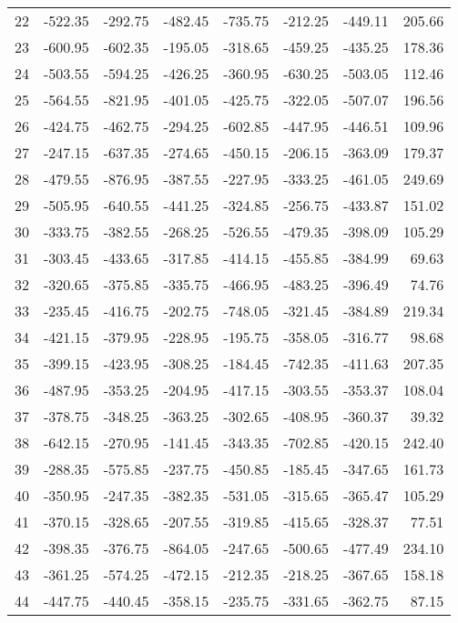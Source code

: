 \begin{longtable}{rrrrrrrr}
22 & -522.35 & -292.75 & -482.45 & -735.75 & -212.25 & -449.11 & 205.66  \\
23 & -600.95 & -602.35 & -195.05 & -318.65 & -459.25 & -435.25 & 178.36  \\
24 & -503.55 & -594.25 & -426.25 & -360.95 & -630.25 & -503.05 & 112.46  \\
25 & -564.55 & -821.95 & -401.05 & -425.75 & -322.05 & -507.07 & 196.56  \\
26 & -424.75 & -462.75 & -294.25 & -602.85 & -447.95 & -446.51 & 109.96  \\
27 & -247.15 & -637.35 & -274.65 & -450.15 & -206.15 & -363.09 & 179.37  \\
28 & -479.55 & -876.95 & -387.55 & -227.95 & -333.25 & -461.05 & 249.69  \\
29 & -505.95 & -640.55 & -441.25 & -324.85 & -256.75 & -433.87 & 151.02  \\
30 & -333.75 & -382.55 & -268.25 & -526.55 & -479.35 & -398.09 & 105.29  \\
31 & -303.45 & -433.65 & -317.85 & -414.15 & -455.85 & -384.99 & 69.63  \\
32 & -320.65 & -375.85 & -335.75 & -466.95 & -483.25 & -396.49 & 74.76  \\
33 & -235.45 & -416.75 & -202.75 & -748.05 & -321.45 & -384.89 & 219.34  \\
34 & -421.15 & -379.95 & -228.95 & -195.75 & -358.05 & -316.77 & 98.68  \\
35 & -399.15 & -423.95 & -308.25 & -184.45 & -742.35 & -411.63 & 207.35  \\
36 & -487.95 & -353.25 & -204.95 & -417.15 & -303.55 & -353.37 & 108.04  \\
37 & -378.75 & -348.25 & -363.25 & -302.65 & -408.95 & -360.37 & 39.32  \\
38 & -642.15 & -270.95 & -141.45 & -343.35 & -702.85 & -420.15 & 242.40  \\
39 & -288.35 & -575.85 & -237.75 & -450.85 & -185.45 & -347.65 & 161.73  \\
40 & -350.95 & -247.35 & -382.35 & -531.05 & -315.65 & -365.47 & 105.29  \\
41 & -370.15 & -328.65 & -207.55 & -319.85 & -415.65 & -328.37 & 77.51  \\
42 & -398.35 & -376.75 & -864.05 & -247.65 & -500.65 & -477.49 & 234.10  \\
43 & -361.25 & -574.25 & -472.15 & -212.35 & -218.25 & -367.65 & 158.18  \\
44 & -447.75 & -440.45 & -358.15 & -235.75 & -331.65 & -362.75 & 87.15  \\

\end{longtable}
